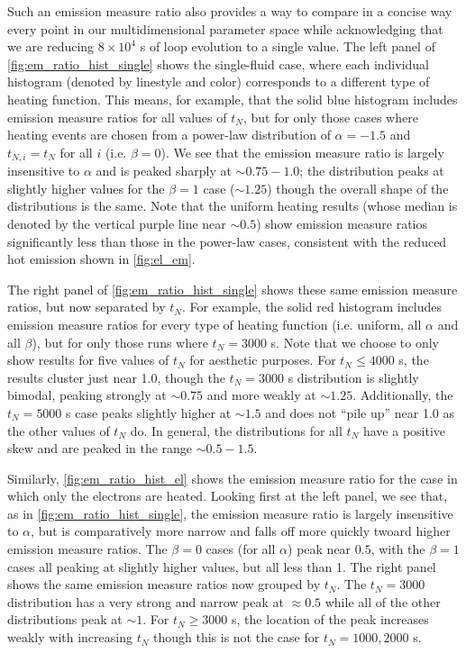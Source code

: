 \documentclass[preprint,linenumbers]{aastex}
\begin{document}
	\par Such an emission measure ratio also provides a way to compare in a concise way every point in our multidimensional parameter space while acknowledging that we are reducing $8\times10^4$ s of loop evolution to a single value. The left panel of \autoref{fig:em_ratio_hist_single} shows the single-fluid case, where each individual histogram (denoted by linestyle and color) corresponds to a different type of heating function. This means, for example, that the solid blue histogram includes emission measure ratios for all values of $t_N$, but for only those cases where heating events are chosen from a power-law distribution of $\alpha=-1.5$ and $t_{N,i}=t_N$ for all $i$ (i.e. $\beta=0$). We see that the emission measure ratio is largely insensitive to $\alpha$ and is peaked sharply at $\sim0.75-1.0$; the distribution peaks at slightly higher values for the $\beta=1$ case ($\sim1.25$) though the overall shape of the distributions is the same. Note that the uniform heating results (whose median is denoted by the vertical purple line near $\sim0.5$) show emission measure ratios significantly less than those in the power-law cases, consistent with the reduced hot emission shown in \autoref{fig:el_em}. 
	\par The right panel of \autoref{fig:em_ratio_hist_single} shows these same emission measure ratios, but now separated by $t_N$. For example, the solid red histogram includes emission measure ratios for every type of heating function (i.e. uniform, all $\alpha$ and all $\beta$), but for only those runs where $t_N=3000$ s. Note that we choose to only show results for five values of $t_N$ for aesthetic purposes. For $t_N\le4000$ s, the results cluster just near 1.0, though the $t_N=3000$ s distribution is slightly bimodal, peaking strongly at $\sim0.75$ and more weakly at $\sim1.25$. Additionally, the $t_N=5000$ s case peaks slightly higher at $\sim1.5$ and does not ``pile up'' near 1.0 as the other values of $t_N$ do. In general, the distributions for all $t_N$ have a positive skew and are peaked in the range $\sim0.5-1.5$.
	\par Similarly, \autoref{fig:em_ratio_hist_el} shows the emission measure ratio for the case in which only the electrons are heated. Looking first at the left panel, we see that, as in \autoref{fig:em_ratio_hist_single}, the emission measure ratio is largely insensitive to $\alpha$, but is comparatively more narrow and falls off more quickly twoard higher emission measure ratios. The $\beta=0$ cases (for all $\alpha$) peak near $0.5$, with the $\beta=1$ cases all peaking at slightly higher values, but all less than 1. The right panel shows the same emission measure ratios now grouped by $t_N$. The $t_N=3000$ distribution has a very strong and narrow peak at $\approx0.5$ while all of the other distributions peak at $\sim1$. For $t_N\ge3000$ s, the location of the peak increases weakly with increasing $t_N$ though this is not the case for $t_N=1000,2000$ s. 
\end{document}
